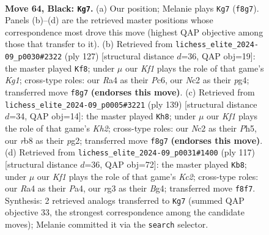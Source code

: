 \documentclass[11pt]{article}
\begin{document}
\clearpage

\begin{figure}[p]\centering
\begin{subfigure}{0.46\textwidth}\centering
\resizebox{\linewidth}{!}{%
\newchessgame
\chessboard[
  setfen={1R3k2/8/7r/8/r5bB/6R1/2n2P2/7K b - - 8 64},
  showmover=false,
  pgfstyle=straightmove, color=movearrow, markmove={f8-g7}
]}
\caption{}
\end{subfigure}\hfill
\begin{subfigure}{0.46\textwidth}\centering
\resizebox{\linewidth}{!}{%
\newchessgame
\chessboard[
  setfen={6k1/6R1/2p5/P3B3/r5PK/3b4/8/8 b - - 0 64},
  showmover=false,
  pgfstyle=straightmove, color=movearrow, markmove={g8-f8}
]}
\caption{}
\end{subfigure}
\\[4pt]
\begin{subfigure}{0.46\textwidth}\centering
\resizebox{\linewidth}{!}{%
\newchessgame
\chessboard[
  setfen={4r3/7k/8/6Rp/8/4B2P/4K1P1/8 b - - 6 70},
  showmover=false,
  pgfstyle=straightmove, color=movearrow, markmove={h7-h8}
]}
\caption{}
\end{subfigure}\hfill
\begin{subfigure}{0.46\textwidth}\centering
\resizebox{\linewidth}{!}{%
\newchessgame
\chessboard[
  setfen={8/2k2R2/8/2K4p/p1B3bP/6P1/2r5/8 b - - 2 59},
  showmover=false,
  pgfstyle=straightmove, color=movearrow, markmove={c7-b8}
]}
\caption{}
\end{subfigure}
\caption{\textbf{Move 64, Black: \texttt{Kg7}.} (a) Our position; Melanie plays \texttt{Kg7} (\texttt{f8g7}). Panels (b)--(d) are the retrieved master positions whose correspondence most drove this move (highest QAP objective among those that transfer to it). (b) Retrieved from \texttt{lichess\_elite\_2024-09\_p0030\#2322} (ply 127) [structural distance $d$=36, QAP obj=19]: the master played \texttt{Kf8}; under $\mu$ our \emph{Kf1} plays the role of that game's \emph{Kg1}; cross-type roles: our \emph{R}a4 as their \emph{P}c6, our \emph{N}c2 as their \emph{p}g4; transferred move \texttt{f8g7} \textbf{(endorses this move)}. (c) Retrieved from \texttt{lichess\_elite\_2024-09\_p0005\#3221} (ply 139) [structural distance $d$=34, QAP obj=14]: the master played \texttt{Kh8}; under $\mu$ our \emph{Kf1} plays the role of that game's \emph{Kh2}; cross-type roles: our \emph{N}c2 as their \emph{P}h5, our \emph{r}b8 as their \emph{p}g2; transferred move \texttt{f8g7} \textbf{(endorses this move)}. (d) Retrieved from \texttt{lichess\_elite\_2024-09\_p0031\#1400} (ply 117) [structural distance $d$=36, QAP obj=72]: the master played \texttt{Kb8}; under $\mu$ our \emph{Kf1} plays the role of that game's \emph{Kc2}; cross-type roles: our \emph{R}a4 as their \emph{P}a4, our \emph{r}g3 as their \emph{B}g4; transferred move \texttt{f8f7}. Synthesis: 2 retrieved analogs transferred to \texttt{Kg7} (summed QAP objective 33, the strongest correspondence among the candidate moves); Melanie committed it via the \texttt{search} selector.}
\label{fig:thought-m127}
\end{figure}
\end{document}
